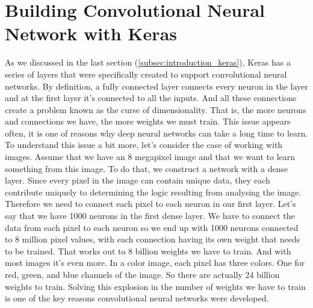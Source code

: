 \section{Building Convolutional Neural Network with Keras}
\label{sec:buildcnn}
%
As we discussed in the last section (\ref{subsec:introduction_keras}), Keras 
has a series of layers that were specifically created to support convolutional 
neural networks.
By definition, a fully connected layer connects every neuron in the layer and 
at the first layer it's connected to all the inputs. 
And all these connections create a problem known as the curse of 
dimensionality. 
That is, the more neurons and connections we have, the more weights we must 
train. 
This issue appears often, it is one of reasons why deep neural networks can 
take a long time to learn. 
To understand this issue a bit more, let's consider the case of working with 
images. 
Assume that we have an 8 megapixel image and that we want to learn 
something from this image. 
To do that, we construct a network with a dense layer. 
Since every pixel in the image can contain unique data, they each contribute 
uniquely to determining the logic resulting from analysing the image. 
Therefore we need to connect each pixel to each neuron in our first layer. 
Let's say that we have 1000 neurons in the first dense layer.
We have to connect the data from each pixel to each neuron so we end up with 
1000 neurons connected to 8 million pixel values, with each connection having 
its own weight that needs to be trained. 
That works out to 8 billion weights we have to train. 
And with most images it's even more. In a color image, each pixel has three 
colors. 
One for red, green, and blue channels of the image. 
So there are actually 24 billion weights to train.
Solving this explosion in the number of weights we have to train is one of the 
key reasons convolutional neural networks were developed. 
%
